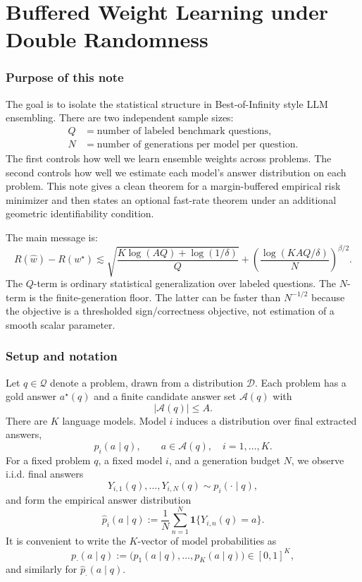 \documentclass[11pt]{article}
\newcommand{\Q}{\mathcal Q}
\newcommand{\A}{\mathcal A}
\newcommand{\D}{\mathcal D}
\newcommand{\one}{\mathbf 1}
\newcommand{\what}{\widehat w}
\newcommand{\wstar}{w^\star}
\begin{document}
\part{Buffered Weight Learning under Double Randomness}
\section{Purpose of this note}

The goal is to isolate the statistical structure in Best-of-Infinity style LLM ensembling.  There are two independent sample sizes:
\[
\begin{aligned}
Q &= \text{number of labeled benchmark questions},\\
N &= \text{number of generations per model per question}.
\end{aligned}
\]
The first controls how well we learn ensemble weights across problems.  The second controls how well we estimate each model's answer distribution on each problem.  This note gives a clean theorem for a margin-buffered empirical risk minimizer and then states an optional fast-rate theorem under an additional geometric identifiability condition.

The main message is:
\[
\boxed{
R(\what)-R(\wstar)
\lesssim
\sqrt{\frac{K\log(AQ)+\log(1/\delta)}{Q}}
+
\left(\frac{\log(KAQ/\delta)}{N}\right)^{\beta/2}.}
\]
The $Q$-term is ordinary statistical generalization over labeled questions.  The $N$-term is the finite-generation floor.  The latter can be faster than $N^{-1/2}$ because the objective is a thresholded sign/correctness objective, not estimation of a smooth scalar parameter.

\section{Setup and notation}

Let $q\in\Q$ denote a problem, drawn from a distribution $\D$.  Each problem has a gold answer $a^\star(q)$ and a finite candidate answer set $\A(q)$ with
\[
|\A(q)|\le A.
\]
There are $K$ language models.  Model $i$ induces a distribution over final extracted answers,
\[
p_i(a\mid q),\qquad a\in\A(q),\quad i=1,\dots,K.
\]
For a fixed problem $q$, a fixed model $i$, and a generation budget $N$, we observe i.i.d. final answers
\[
Y_{i,1}(q),\dots,Y_{i,N}(q)\sim p_i(\cdot\mid q),
\]
and form the empirical answer distribution
\[
\widehat p_i(a\mid q)
:=
\frac1N\sum_{n=1}^N \one\{Y_{i,n}(q)=a\}.
\]
It is convenient to write the $K$-vector of model probabilities as
\[
p_\cdot(a\mid q)
:=
\big(p_1(a\mid q),\dots,p_K(a\mid q)\big)\in[0,1]^K,
\]
and similarly for $\widehat p_\cdot(a\mid q)$.
\end{document}
